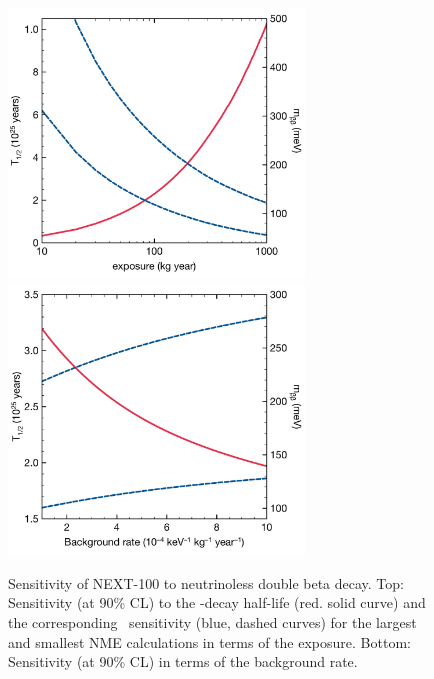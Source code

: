 \begin{figure}
\centering
\includegraphics[width=0.7\textwidth]{img2/Next100SensitivityVsExposure.pdf}
\includegraphics[width=0.7\textwidth]{img2/Next100SensitivityVsBackground.pdf}
\caption{Sensitivity of NEXT-100 to neutrinoless double beta decay. Top: Sensitivity (at 90\% CL) to the \bbonu-decay half-life (red. solid curve) and the corresponding \mbb\ sensitivity (blue, dashed curves) for the largest and smallest NME calculations in terms of the exposure. Bottom: Sensitivity (at 90\% CL) in terms of the background rate.} \label{fig:SensitivityNEXT100}
\end{figure}
